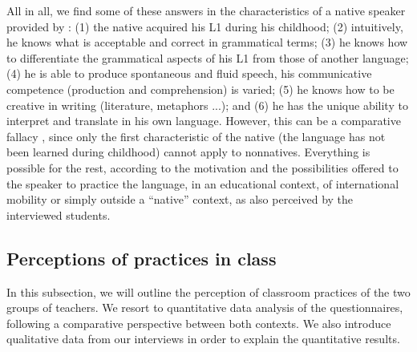 \documentclass[output=paper]{../langscibook}
\begin{document}
All in all, we find some of these answers in the characteristics of a native speaker provided  by \citet[210--211]{Davies2003}: (1) the native acquired his L1 during his childhood; (2) intuitively, he knows what is acceptable and correct in grammatical terms; (3) he knows how to differentiate the grammatical aspects of his L1 from those of another language; (4) he is able to produce spontaneous and fluid speech, his communicative competence (production and comprehension) is varied; (5)  he knows how to be creative in writing (literature, metaphors ...); and (6)  he has the unique ability to interpret and translate in his own language. However, this can be a comparative fallacy \citep{Bley-Vromon1983}, since only the first characteristic of the native (the language has not been learned during childhood) cannot apply to nonnatives. Everything is possible for the rest, according to the motivation and the possibilities offered to the speaker to practice the language, in an educational context, of international mobility or simply outside a “native” context, as also perceived by the interviewed students.

 \subsection{Perceptions of practices in class}


In this subsection, we will outline the perception of classroom practices of the two groups of teachers. We resort to quantitative data analysis of the questionnaires, following a comparative perspective between both contexts. We also introduce qualitative data from our interviews in order to explain the quantitative results.
  
\end{document}
